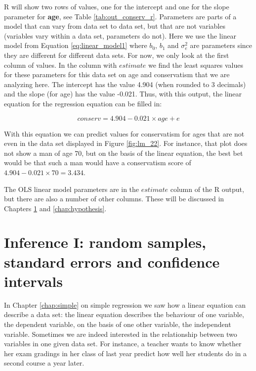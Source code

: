 \documentclass[]{book}\usepackage[]{graphicx}\usepackage[]{color}
\begin{document}
R will show two rows of values, one for the intercept and one for the slope parameter for \textbf{age}, see Table \ref{tab:out_conserv_r}. Parameters are parts of a model that can vary from data set to data set, but that are not variables (variables vary within a data set, parameters do not). Here we use the linear model from Equation \ref{eq:linear_model1} where $b_0$, $b_1$ and $\sigma_e^2$ are parameters since they are different for different data sets. For now, we only look at the first column of values. In the column with $estimate$ we find the least squares values for these parameters for this data set on age and conservatism that we are analyzing here. The intercept has the value 4.904 (when rounded to 3 decimals) and the slope (for age) has the value -0.021. Thus, with this output, the linear equation for the regression equation can be filled in:

\begin{equation}
conserv = 4.904 -0.021 \times age + e
\end{equation}

With this equation we can predict values for conservatism for ages that are not even in the data set displayed in Figure \ref{fig:lm_22}. For instance, that plot does not show a man of age 70, but on the basis of the linear equation, the best bet would be that such a man would have a conservatism score of $4.904 -0.021 \times 70= 3.434$.


The OLS linear model parameters are in the $estimate$ column of the R output, but there are also a number of other columns. These will be discussed in Chapters \ref{chap:confidence} and \ref{chap:hypothesis}.  %


\chapter{Inference I: random samples, standard errors and confidence intervals}\label{chap:confidence}

In Chapter \ref{chap:simple} on simple regression we saw how a linear equation can describe a data set: the linear equation describes the behaviour of one variable, the dependent variable, on the basis of one other variable, the independent variable. Sometimes we are indeed interested in the relationship between two variables in one given data set. For instance, a teacher wants to know whether her exam gradings in her class of last year predict how well her students do in a second course a year later.
\end{document}
